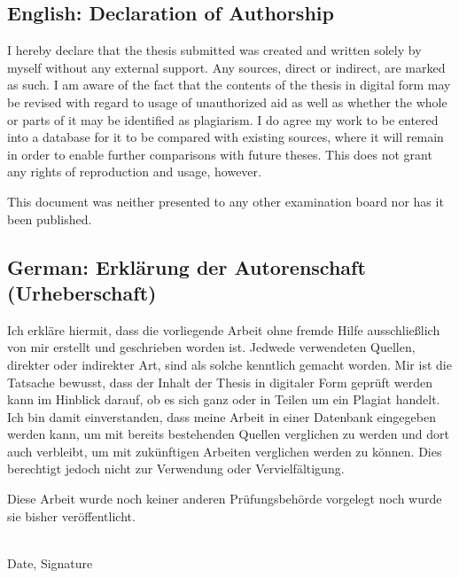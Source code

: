 \documentclass[a4paper,11pt,oneside]{article}
\theoremstyle{definition}
\begin{document}
  \subsection*{English: Declaration of Authorship}
 
  I hereby declare that the thesis submitted was created and written
  solely by myself without any external support. Any sources, direct
  or indirect, are marked as such. I am aware of the fact that the
  contents of the thesis in digital form may be revised with regard to
  usage of unauthorized aid as well as whether the whole or parts of
  it may be identified as plagiarism. I do agree my work to be entered
  into a database for it to be compared with existing sources, where
  it will remain in order to enable further comparisons with future
  theses. This does not grant any rights of reproduction and usage,
  however.

  This document was neither presented to any other examination board
  nor has it been published.

  \subsection*{German: Erklärung der Autorenschaft (Urheberschaft)}
 
  Ich erkläre hiermit, dass die vorliegende Arbeit ohne fremde Hilfe ausschließlich von mir erstellt und geschrieben worden ist. Jedwede verwendeten Quellen, direkter oder indirekter Art, sind als solche kenntlich gemacht worden. Mir ist die Tatsache bewusst, dass der Inhalt der Thesis in digitaler Form geprüft werden kann im Hinblick darauf, ob es sich ganz oder in Teilen um ein Plagiat handelt. Ich bin damit einverstanden, dass meine Arbeit in einer Datenbank eingegeben werden kann, um mit bereits bestehenden Quellen verglichen zu werden und dort auch verbleibt, um mit zukünftigen Arbeiten verglichen werden zu können. Dies berechtigt jedoch nicht zur Verwendung  oder Vervielfältigung.

  Diese Arbeit wurde noch keiner anderen Prüfungsbehörde vorgelegt noch wurde sie bisher veröffentlicht.


  \vspace{20mm}

  \dotfill\\
  Date, Signature

  \newpage
\end{document}

